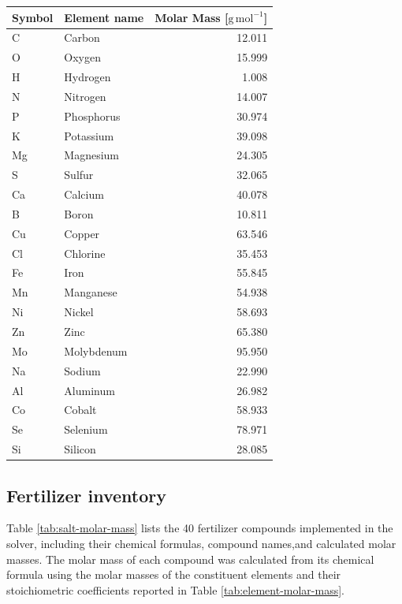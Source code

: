 \documentclass[
  letterpaper,
  DIV=11,
  numbers=noendperiod]{scrreprt}
\begin{document}
{\begin{minipage}
\begin{tabular}{llr}
\toprule
Symbol & Element name & Molar Mass [$\mathrm{g\,mol^{-1}}$]\\
\midrule
C & Carbon & 12.011\\
O & Oxygen & 15.999\\
H & Hydrogen & 1.008\\
N & Nitrogen & 14.007\\
P & Phosphorus & 30.974\\
\addlinespace
K & Potassium & 39.098\\
Mg & Magnesium & 24.305\\
S & Sulfur & 32.065\\
Ca & Calcium & 40.078\\
B & Boron & 10.811\\
\addlinespace
Cu & Copper & 63.546\\
Cl & Chlorine & 35.453\\
Fe & Iron & 55.845\\
Mn & Manganese & 54.938\\
Ni & Nickel & 58.693\\
\addlinespace
Zn & Zinc & 65.380\\
Mo & Molybdenum & 95.950\\
Na & Sodium & 22.990\\
Al & Aluminum & 26.982\\
Co & Cobalt & 58.933\\
\addlinespace
Se & Selenium & 78.971\\
Si & Silicon & 28.085\\
\bottomrule
\end{tabular}
\end{minipage}} \endgroup

\par

\subsection{Fertilizer inventory}\label{fertilizer-inventory}

Table \ref{tab:salt-molar-mass} lists the 40 fertilizer compounds
implemented in the solver, including their chemical formulas, compound
names,and calculated molar masses. The molar mass of each compound was
calculated from its chemical formula using the molar masses of the
constituent elements and their stoichiometric coefficients reported in
Table \ref{tab:element-molar-mass}.

\par
\end{document}
